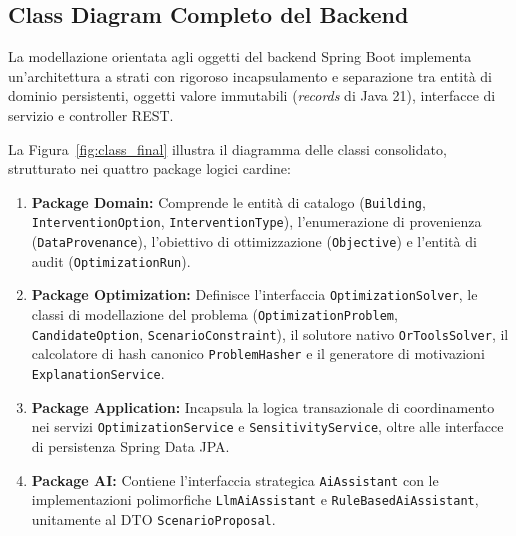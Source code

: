 \clearpage

\subsection{Class Diagram Completo del Backend}
La modellazione orientata agli oggetti del backend Spring Boot implementa un'architettura a strati con rigoroso incapsulamento e separazione tra entità di dominio persistenti, oggetti valore immutabili (\emph{records} di Java 21), interfacce di servizio e controller REST.

La Figura~\ref{fig:class_final} illustra il diagramma delle classi consolidato, strutturato nei quattro package logici cardine:
\begin{enumerate}[label=\alph*), itemsep=0.2em]
    \item \textbf{Package Domain:} Comprende le entità di catalogo (\texttt{Building}, \texttt{InterventionOption}, \texttt{InterventionType}), l'enumerazione di provenienza (\texttt{DataProvenance}), l'obiettivo di ottimizzazione (\texttt{Objective}) e l'entità di audit (\texttt{OptimizationRun}).
    \item \textbf{Package Optimization:} Definisce l'interfaccia \texttt{OptimizationSolver}, le classi di modellazione del problema (\texttt{OptimizationProblem}, \texttt{CandidateOption}, \texttt{ScenarioConstraint}), il solutore nativo \texttt{OrToolsSolver}, il calcolatore di hash canonico \texttt{ProblemHasher} e il generatore di motivazioni \texttt{ExplanationService}.
    \item \textbf{Package Application:} Incapsula la logica transazionale di coordinamento nei servizi \texttt{OptimizationService} e \texttt{SensitivityService}, oltre alle interfacce di persistenza Spring Data JPA.
    \item \textbf{Package AI:} Contiene l'interfaccia strategica \texttt{AiAssistant} con le implementazioni polimorfiche \texttt{LlmAiAssistant} e \texttt{RuleBasedAiAssistant}, unitamente al DTO \texttt{ScenarioProposal}.
\end{enumerate}

